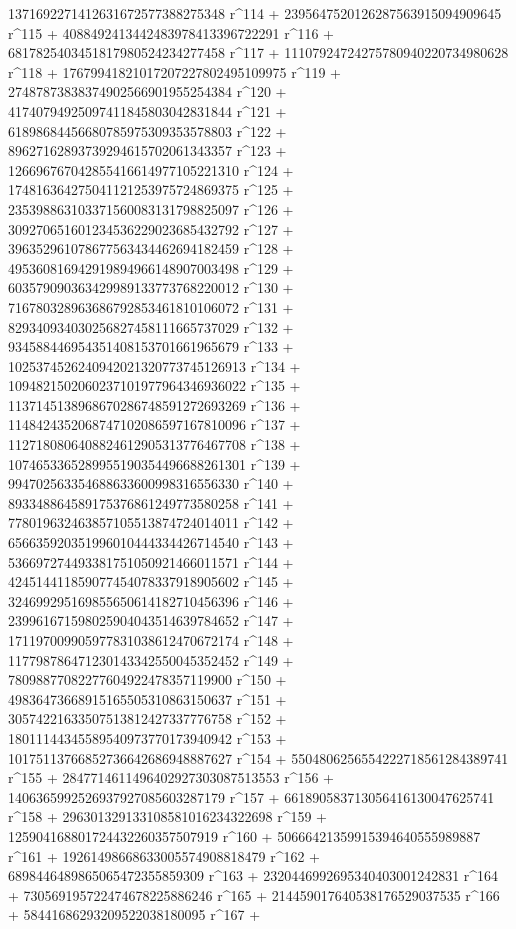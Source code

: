        1371692271412631672577388275348 r^114 + 
       2395647520126287563915094909645 r^115 + 
       4088492413442483978413396722291 r^116 + 
       6817825403451817980524234277458 r^117 + 
       11107924724275780940220734980628 r^118 + 
       17679941821017207227802495109975 r^119 + 
       27487873838374902566901955254384 r^120 + 
       41740794925097411845803042831844 r^121 + 
       61898684456680785975309353578803 r^122 + 
       89627162893739294615702061343357 r^123 + 
       126696767042855416614977105221310 r^124 + 
       174816364275041121253975724869375 r^125 + 
       235398863103371560083131798825097 r^126 + 
       309270651601234536229023685432792 r^127 + 
       396352961078677563434462694182459 r^128 + 
       495360816942919894966148907003498 r^129 + 
       603579090363429989133773768220012 r^130 + 
       716780328963686792853461810106072 r^131 + 
       829340934030256827458111665737029 r^132 + 
       934588446954351408153701661965679 r^133 + 
       1025374526240942021320773745126913 r^134 + 
       1094821502060237101977964346936022 r^135 + 
       1137145138968670286748591272693269 r^136 + 
       1148424352068747102086597167810096 r^137 + 
       1127180806408824612905313776467708 r^138 + 
       1074653365289955190354496688261301 r^139 + 
       994702563354688633600998316556330 r^140 + 
       893348864589175376861249773580258 r^141 + 
       778019632463857105513874724014011 r^142 + 
       656635920351996010444334426714540 r^143 + 
       536697274493381751050921466011571 r^144 + 
       424514411859077454078337918905602 r^145 + 
       324699295169855650614182710456396 r^146 + 
       239961671598025904043514639784652 r^147 + 
       171197009905977831038612470672174 r^148 + 
       117798786471230143342550045352452 r^149 + 
       78098877082277604922478357119900 r^150 + 
       49836473668915165505310863150637 r^151 + 
       30574221633507513812427337776758 r^152 + 
       18011144345589540973770173940942 r^153 + 
       10175113766852736642686948887627 r^154 + 
       5504806256554222718561284389741 r^155 + 
       2847714611496402927303087513553 r^156 + 
       1406365992526937927085603287179 r^157 + 
       661890583713056416130047625741 r^158 + 
       296301329133108581016234322698 r^159 + 
       125904168801724432260357507919 r^160 + 
       50666421359915394640555989887 r^161 + 
       19261498668633005574908818479 r^162 + 
       6898446489865065472355859309 r^163 + 
       2320446992695340403001242831 r^164 + 
       730569195722474678225886246 r^165 + 
       214459017640538176529037535 r^166 + 
       58441686293209522038180095 r^167 + 
